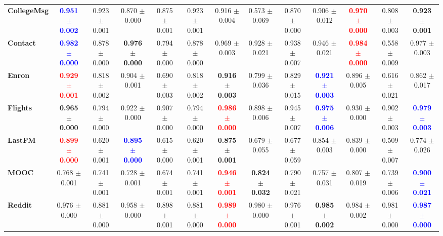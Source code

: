 {\begin{tabular}{lccccc|ccccccc}
\textbf{CollegeMsg} 
& \textcolor{blue}{\textbf{0.951 $\pm$ 0.002 }}
& 0.923 $\pm$ 0.001 
& 0.870 $\pm$ 0.000 
& 0.875 $\pm$ 0.001 
& 0.923 $\pm$ 0.001 
& 0.916 $\pm$ 0.004 
& 0.573 $\pm$ 0.069 
& 0.870 $\pm$ 0.000 
& 0.906 $\pm$ 0.012 
& \textcolor{red}{\textbf{0.970 $\pm$ 0.000 }}
& 0.808 $\pm$ 0.003 
& \textbf{0.923 $\pm$ 0.001 } \\
\textbf{Contact} 
& \textcolor{blue}{\textbf{0.982 $\pm$ 0.000 }}
& 0.878 $\pm$ 0.000 
& \textbf{0.976 $\pm$ 0.000 }
& 0.794 $\pm$ 0.000 
& 0.878 $\pm$ 0.000 
& 0.969 $\pm$ 0.003 
& 0.928 $\pm$ 0.021 
& 0.938 $\pm$ 0.007 
& 0.946 $\pm$ 0.021 
& \textcolor{red}{\textbf{0.984 $\pm$ 0.000 }}
& 0.558 $\pm$ 0.009 
& 0.977 $\pm$ 0.003  \\
\textbf{Enron} 
& \textcolor{red}{\textbf{0.929 $\pm$ 0.001 }}
& 0.818 $\pm$ 0.002 
& 0.904 $\pm$ 0.001 
& 0.690 $\pm$ 0.003 
& 0.818 $\pm$ 0.002 
& \textbf{0.916 $\pm$ 0.003 }
& 0.799 $\pm$ 0.036 
& 0.829 $\pm$ 0.015 
& \textcolor{blue}{\textbf{0.921 $\pm$ 0.003 }}
& 0.896 $\pm$ 0.005 
& 0.616 $\pm$ 0.021 
& 0.862 $\pm$ 0.017  \\
\textbf{Flights} 
& \textbf{0.965 $\pm$ 0.000 }
& 0.794 $\pm$ 0.000 
& 0.922 $\pm$ 0.000 
& 0.907 $\pm$ 0.000 
& 0.794 $\pm$ 0.000 
& \textcolor{red}{\textbf{0.986 $\pm$ 0.000 }}
& 0.898 $\pm$ 0.006 
& 0.945 $\pm$ 0.007 
& \textcolor{blue}{\textbf{0.975 $\pm$ 0.006 }}
& 0.930 $\pm$ 0.000 
& 0.902 $\pm$ 0.003 
& \textcolor{blue}{\textbf{0.979 $\pm$ 0.003 }} \\
\textbf{LastFM} 
& \textcolor{red}{\textbf{0.899 $\pm$ 0.000 }}
& 0.620 $\pm$ 0.001 
& \textcolor{blue}{\textbf{0.895 $\pm$ 0.000 }}
& 0.615 $\pm$ 0.000 
& 0.620 $\pm$ 0.001 
& \textbf{0.875 $\pm$ 0.001 }
& 0.679 $\pm$ 0.055 
& 0.677 $\pm$ 0.059 
& 0.854 $\pm$ 0.003 
& 0.839 $\pm$ 0.000 
& 0.509 $\pm$ 0.007 
& 0.774 $\pm$ 0.026  \\
\textbf{MOOC} 
& 0.768 $\pm$ 0.001 
& 0.741 $\pm$ 0.001 
& 0.728 $\pm$ 0.001 
& 0.674 $\pm$ 0.001 
& 0.741 $\pm$ 0.001 
& \textcolor{red}{\textbf{0.946 $\pm$ 0.001 }}
& \textbf{0.824 $\pm$ 0.032 }
& 0.790 $\pm$ 0.021 
& 0.757 $\pm$ 0.031 
& 0.807 $\pm$ 0.019 
& 0.739 $\pm$ 0.006 
& \textcolor{blue}{\textbf{0.900 $\pm$ 0.021 }} \\
\textbf{Reddit} 
& 0.976 $\pm$ 0.000
& 0.881 $\pm$ 0.000 
& 0.958 $\pm$ 0.000 
& 0.898 $\pm$ 0.001 
& 0.881 $\pm$ 0.000 
& \textcolor{red}{\textbf{0.989 $\pm$ 0.000 }}
& 0.980 $\pm$ 0.000
& 0.976 $\pm$ 0.001
& \textbf{0.985 $\pm$ 0.002 }
& 0.984 $\pm$ 0.002
& 0.981 $\pm$ 0.000
& \textcolor{blue}{\textbf{0.987 $\pm$ 0.000 }} \\

\end{tabular}}
